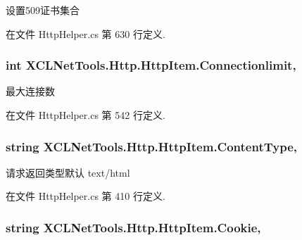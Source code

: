 设置509证书集合 



在文件 Http\-Helper.\-cs 第 630 行定义.

\hypertarget{class_x_c_l_net_tools_1_1_http_1_1_http_item_aec31f6a1aee8eb9db56ac8f606577b50}{
\subsubsection[{Connectionlimit}]{\setlength{\rightskip}{0pt plus 5cm}int X\-C\-L\-Net\-Tools.\-Http.\-Http\-Item.\-Connectionlimit\hspace{0.3cm}{\ttfamily [get]}, {\ttfamily [set]}}}\label{class_x_c_l_net_tools_1_1_http_1_1_http_item_aec31f6a1aee8eb9db56ac8f606577b50}


最大连接数 



在文件 Http\-Helper.\-cs 第 542 行定义.

\hypertarget{class_x_c_l_net_tools_1_1_http_1_1_http_item_a9eb33692e42e8900e183f3230f1f25d0}{
\subsubsection[{Content\-Type}]{\setlength{\rightskip}{0pt plus 5cm}string X\-C\-L\-Net\-Tools.\-Http.\-Http\-Item.\-Content\-Type\hspace{0.3cm}{\ttfamily [get]}, {\ttfamily [set]}}}\label{class_x_c_l_net_tools_1_1_http_1_1_http_item_a9eb33692e42e8900e183f3230f1f25d0}


请求返回类型默认 text/html 



在文件 Http\-Helper.\-cs 第 410 行定义.

\hypertarget{class_x_c_l_net_tools_1_1_http_1_1_http_item_af2eceddbe3b702399d4a13369207f5f6}{
\subsubsection[{Cookie}]{\setlength{\rightskip}{0pt plus 5cm}string X\-C\-L\-Net\-Tools.\-Http.\-Http\-Item.\-Cookie\hspace{0.3cm}{\ttfamily [get]}, {\ttfamily [set]}}}\label{class_x_c_l_net_tools_1_1_http_1_1_http_item_af2eceddbe3b702399d4a13369207f5f6}


